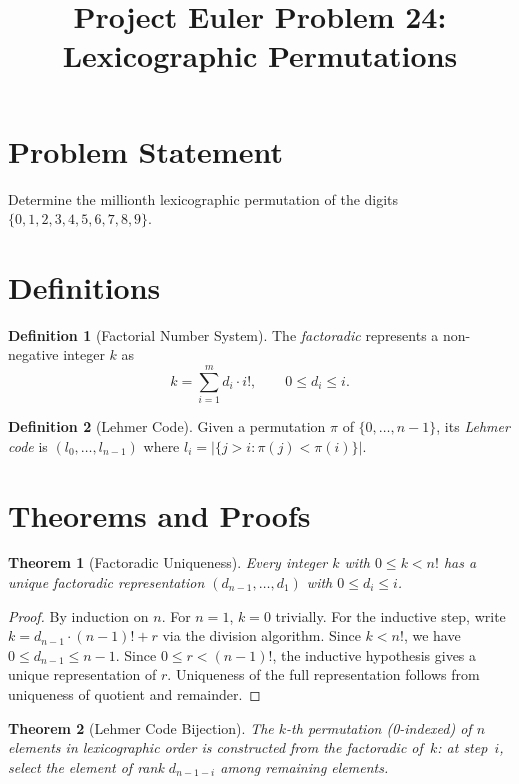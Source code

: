 \documentclass[12pt,a4paper]{article}
\title{Project Euler Problem 24: Lexicographic Permutations}
\author{}
\date{}
\newtheorem{theorem}{Theorem}
\theoremstyle{definition}
\newtheorem{definition}{Definition}
\theoremstyle{remark}
\begin{document}
\maketitle

\section{Problem Statement}

Determine the millionth lexicographic permutation of the digits $\{0, 1, 2, 3, 4, 5, 6, 7, 8, 9\}$.

\section{Definitions}

\begin{definition}[Factorial Number System]
The \emph{factoradic} represents a non-negative integer $k$ as
\[
k = \sum_{i=1}^{m} d_i \cdot i!, \qquad 0 \leq d_i \leq i.
\]
\end{definition}

\begin{definition}[Lehmer Code]
Given a permutation $\pi$ of $\{0, \ldots, n-1\}$, its \emph{Lehmer code} is $(l_0, \ldots, l_{n-1})$ where $l_i = |\{j > i : \pi(j) < \pi(i)\}|$.
\end{definition}

\section{Theorems and Proofs}

\begin{theorem}[Factoradic Uniqueness]
Every integer $k$ with $0 \leq k < n!$ has a unique factoradic representation $(d_{n-1}, \ldots, d_1)$ with $0 \leq d_i \leq i$.
\end{theorem}

\begin{proof}
By induction on $n$. For $n = 1$, $k = 0$ trivially. For the inductive step, write $k = d_{n-1} \cdot (n-1)! + r$ via the division algorithm. Since $k < n!$, we have $0 \leq d_{n-1} \leq n-1$. Since $0 \leq r < (n-1)!$, the inductive hypothesis gives a unique representation of $r$. Uniqueness of the full representation follows from uniqueness of quotient and remainder.
\end{proof}

\begin{theorem}[Lehmer Code Bijection]
The $k$-th permutation (0-indexed) of $n$ elements in lexicographic order is constructed from the factoradic of~$k$: at step~$i$, select the element of rank $d_{n-1-i}$ among remaining elements.
\end{theorem}
\end{document}
